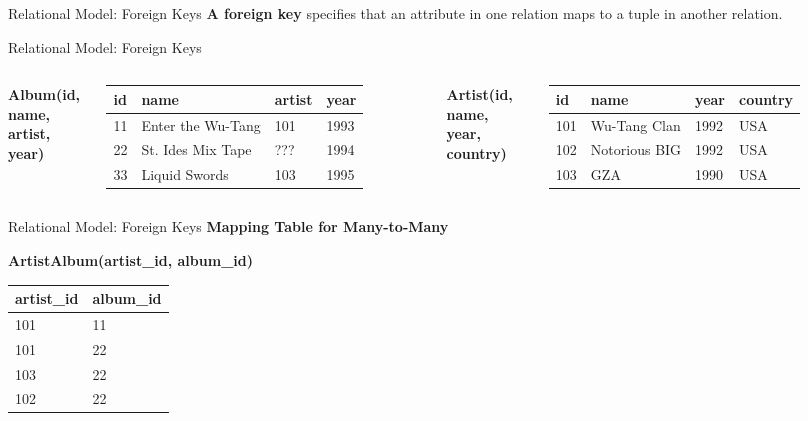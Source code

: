 \begin{frame}{Relational Model: Foreign Keys}
    \textbf{A foreign key} specifies that an attribute in one relation maps to a tuple in another relation.
\end{frame}

\begin{frame}{Relational Model: Foreign Keys}
    \begin{columns}
        \textbf{Album(id, name, artist, year)}
        \begin{table}
        \tiny
        \begin{tabular}{llll}
        \toprule
        id & name & artist & year \\
        \midrule
        11 & Enter the Wu-Tang & 101 & 1993 \\
        22 & St. Ides Mix Tape & ??? & 1994 \\
        33 & Liquid Swords & 103 & 1995 \\
        \bottomrule
        \end{tabular}
        \end{table}

        \textbf{Artist(id, name, year, country)}
        \begin{table}
        \tiny
        \begin{tabular}{llll}
        \toprule
        id & name & year & country \\
        \midrule
        101 & Wu-Tang Clan & 1992 & USA \\
        102 & Notorious BIG & 1992 & USA \\
        103 & GZA & 1990 & USA \\
        \bottomrule
        \end{tabular}
        \end{table}
    \end{columns}
\end{frame}

\begin{frame}{Relational Model: Foreign Keys}
    \textbf{Mapping Table for Many-to-Many}

    \begin{center}
        \textbf{ArtistAlbum(artist\_id, album\_id)}
        \begin{table}
        \begin{tabular}{ll}
        \toprule
        artist\_id & album\_id \\
        \midrule
        101 & 11 \\
        101 & 22 \\
        103 & 22 \\
        102 & 22 \\
        \bottomrule
        \end{tabular}
        \end{table}
    \end{center}
\end{frame}


